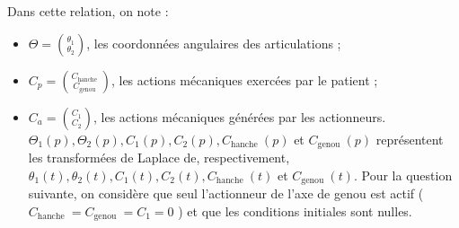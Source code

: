 Dans cette relation, on note :

\begin{itemize}
  \item $\Theta=\binom{\theta_{1}}{\theta_{2}}$, les coordonnées angulaires des articulations ;
  \item $C_{p}=\binom{C_{\text {hanche }}}{C_{\text {genou }}}$, les actions mécaniques exercées par le patient ;
  \item $C_{a}=\binom{C_{1}}{C_{2}}$, les actions mécaniques générées par les actionneurs.\\
$\Theta_{1}(p), \Theta_{2}(p), C_{1}(p), C_{2}(p), C_{\text {hanche }}(p)$ et $C_{\text {genou }}(p)$ représentent les transformées de Laplace de, respectivement, $\theta_{1}(t), \theta_{2}(t), C_{1}(t), C_{2}(t), C_{\text {hanche }}(t)$ et $C_{\text {genou }}(t)$. Pour la question suivante, on considère que seul l'actionneur de l'axe de genou est actif ( $C_{\text {hanche }}=C_{\text {genou }}=C_{1}=0$ ) et que les conditions initiales sont nulles.\\
\end{itemize}



